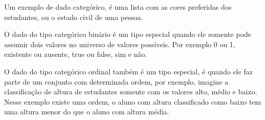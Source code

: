 \documentclass[a4paper,12pt]{book}
\begin{document}
	Um exemplo de dado categórico, é uma lista com as cores preferidas dos estudantes, ou o estado civil de uma pessoa.
	
	O dado do tipo categórico binário é um tipo especial quando ele somente pode assumir dois valores no universo de valores possíveis. Por exemplo 0 ou 1, existente ou ausente, true ou false, sim e não.
	
	O dado do tipo categórico ordinal também é um tipo especial, é quando ele faz parte de um conjunto com determinada ordem, por exemplo, imagine a classificação de altura de estudantes somente com os valores alto, médio e baixo. Nesse exemplo existe uma ordem, o aluno com altura classificado como baixo tem uma altura menor do que o aluno com altura média.
	
	


	
\end{document}
